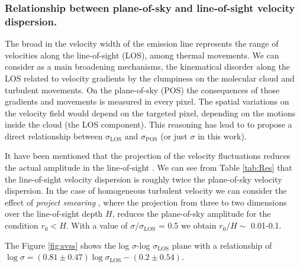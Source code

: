 \documentclass[fleqn,usenatbib, useAMS, a4paper]{mnras}
\begin{document}
\subsubsection{Relationship between plane-of-sky and line-of-sight velocity dispersion.}

The broad in the velocity width of the emission line represents the range of velocities along the line-of-sight (LOS), among thermal movements. 
We can consider as a main broadening mechanisms, the kinematical disorder along the LOS related to velocity gradients by the clumpiness on the molecular cloud and turbulent movements.
On the plane-of-sky (POS) the consequences of those gradients and movements is measured in every pixel. The spatial variations on the velocity field would depend on the targeted pixel, depending on the motions inside the cloud (the LOS component).
This reasoning has lead to \citet{2011MNRAS.413..705L} to propose a direct relationship between \(\sigma_{\text{LOS}}\) and \(\sigma_{\text{POS}}\) (or just \(\sigma\) in this work).

It have been mentioned that the projection of the velocity fluctuations reduces the actual amplitude in the line-of-sight \citep{1984ApJ...277..556S,arthur2016turbulence}.
We can see from Table \ref{tab:Res} that the line-of-sight velocity dispersion is roughly twice the plane-of-sky velocity dispersion.
In the case of homogeneous turbulent velocity we can consider the effect of \textit{project smearing} \citep{1984ApJ...277..556S}, where the projection from three to two dimensions over the line-of-sight depth \(H\), reduces the plane-of-sky amplitude for the condition \(r_{0} < H\).
With a value of \(\sigma / \sigma_{\text{LOS}}\) = 0.5 we obtain \(r_{0} / H \sim\) 0.01-0.1.

The Figure \ref{fig:svss} shows the log $\sigma$-log $\sigma_{\text{LOS}}$ plane with a relationship of $\log \sigma = (0.81 \pm 0.47) \log \sigma_{\text{LOS}}-(0.2 \pm 0.54)$.


\end{document}

